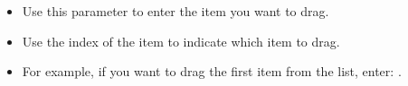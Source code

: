 
\begin{itemize}
\item Use this parameter to enter the item you want to drag.
\item Use the index of the item to indicate which item to drag.
\item For example, if you want to drag the first item from the list, enter: .
\end{itemize}
